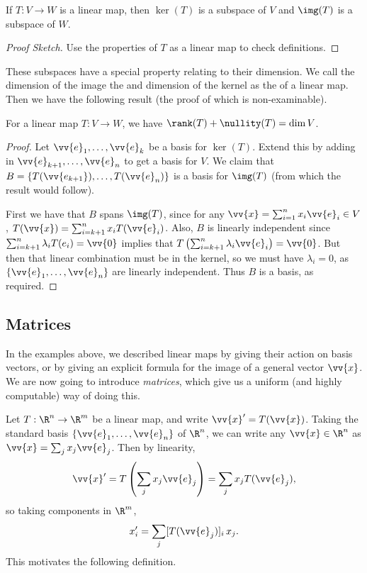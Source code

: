 \begin{proposition}
    If $T : V \rightarrow W$ is a linear map, then $\ker(T)$ is a subspace of $V$ and $\img(T)$ is a subspace of $W$.
\end{proposition}
\begin{proof}[Proof Sketch]
    Use the properties of $T$ as a linear map to check definitions.
\end{proof}

These subspaces have a special property relating to their dimension.
We call the dimension of the image the  and dimension of the kernel as the  of a linear map. Then we have the following result (the proof of which is non-examinable).

\begin{theorem}
    For a linear map $T: V \rightarrow W$, we have $\rank(T) + \nullity(T) = \dim V$.
\end{theorem}
\begin{proof}
    Let $\vv{e}_1, \dots, \vv{e}_k$ be a basis for $\ker (T)$. Extend this by adding in $\vv{e}_{k + 1}, \dots, \vv{e}_n$ to get a basis for $V$. We claim that $B = \{T(\vv{e_{k + 1}}), \dots, T(\vv{e}_n)\}$ is a basis for $\img (T)$ (from which the result would follow).

    First we have that $B$ spans $\img(T)$, since for any $\vv{x} = \sum_{i =1}^n x_i \vv{e}_i \in V$, $T(\vv{x}) = \sum_{i = k+1}^n x_i T(\vv{e}_i)$. Also, $B$ is linearly independent since $\sum_{i = k + 1}^n \lambda_i T(e_i) = \vv{0}$ implies that $T\left(\sum_{i = k + 1}^n \lambda_i \vv{e}_i\right) = \vv{0}$. But then that linear combination must be in the kernel, so we must have $\lambda_i = 0$, as $\{\vv{e}_1, \dots, \vv{e}_n\}$ are linearly independent. Thus $B$ is a basis, as required.
\end{proof}


\subsection{Matrices}

In the examples above, we described linear maps by giving their action on basis vectors, or by giving an explicit formula for the image of a general vector $\vv{x}$. We are now going to introduce \emph{matrices}, which give us a uniform (and highly computable) way of doing this.

Let $T : \R^n \rightarrow \R^m$ be a linear map, and write $\vv{x}' = T(\vv{x})$.
Taking the standard basis $\{\vv{e}_1, \dots, \vv{e}_n\}$ of $\R^n$, we can write any $\vv{x} \in \R^n$ as $\vv{x} = \sum_j x_j \vv{e}_j$. Then by linearity,
$$
\vv{x}' = T\left(\sum_j x_j \vv{e}_j\right) = \sum_j x_j T(\vv{e}_j),
$$
so taking components in $\R^m$,
$$
x_i' = \sum_j [T(\vv{e}_j)]_i \, x_j.
$$
This motivates the following definition.


